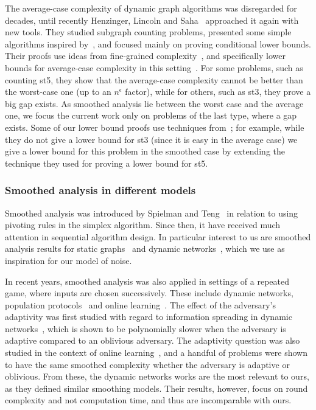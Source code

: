  
The average-case complexity of dynamic graph algorithms was disregarded for decades, until recently Henzinger, Lincoln and Saha~\cite{HLS22}
approached it again with new tools.
They studied subgraph counting problems, 
presented some simple algorithms inspired by~\cite{AlbertsH98},
and focused mainly on proving conditional lower bounds.
Their proofs use ideas from fine-grained complexity~\cite{HenzingerKNS15}, and specifically lower bounds for average-case complexity in this setting~\cite{DalirrooyfardLW20,Boix-AdseraBB19}.
For some problems, such as counting \paths st5, they show that the average-case complexity cannot be better than the worst-case one (up to an $n^\epsilon$ factor), while for others, such as 
\paths st3, they prove a big gap exists.
As smoothed analysis lie between the worst case and the average one, we focus the current work only on problems of the last type, where a gap exists.
Some of our lower bound proofs use techniques from~\cite{HLS22};
for example, while they do not give a lower bound for \paths st3 (since it is easy in the average case) we give a lower bound for this problem in the smoothed case
by extending the technique they used for proving a lower bound for \paths st5.

\subsubsection{Smoothed analysis in different models}
Smoothed analysis was introduced by Spielman and Teng~\cite{SpielmanT04} in relation to using pivoting rules in the simplex algorithm. 
Since then, it have received much attention in sequential algorithm design.
In particular interest to us are smoothed analysis results for static graphs~\cite{krivelevich2006smoothed, friedrich2011smoothed,krivelevich2015smoothed} 
and dynamic networks~\cite{DFGN18,MPS20,GMPS21,DFGN22},
which we use as inspiration for our model of noise.

In recent years, smoothed analysis was also applied in settings of a repeated game, where inputs are chosen successively.
These include dynamic networks, population protocols~\cite{SS21} and online learning~\cite{HRS20,HRS21}.
The effect of the adversary's adaptivity was first studied with regard to information spreading in dynamic networks~\cite{MPS20},
which is shown to be polynomially slower when the adversary is adaptive compared to an oblivious adversary.
The adaptivity question was also studied in the context of online learning~\cite{HRS21}, and a handful of problems were shown to have the same smoothed complexity whether the adversary is adaptive or oblivious.
From these, the dynamic networks works are the most relevant to ours, as they defined similar smoothing models. 
Their results, however, focus on round complexity and not computation time, and thus are incomparable with ours.